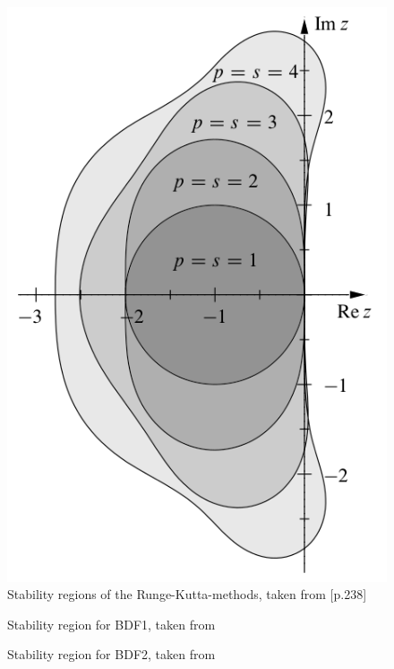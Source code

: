 \documentclass{report}
\begin{document}
\begin{figure}[h]
\centering
\begin{minipage}[b]{0.45\textwidth}
\centering
\includegraphics[width=\textwidth]{../Drawings/Runge_Kutter_stability_regions}
\caption{Stability regions of the Runge-Kutta-methods, taken from \cite{Stab_RK}[p.238]}
\end{minipage}
\end{figure}

\begin{figure}[h]
\centering
\begin{minipage}[b]{0.45\textwidth}
\centering
\hspace*{-1cm}
\scalebox{0.42}{

}
\caption{Stability region for BDF1, taken from \cite{Stab_BDF}}
\end{minipage}
\hfill
\begin{minipage}[b]{0.45\textwidth}
\centering
\hspace*{-1cm}
\scalebox{0.42}{

}
\caption{Stability region for BDF2, taken from \cite{Stab_BDF}}
\end{minipage}
\end{figure}
\end{document}
